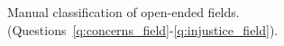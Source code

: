 \begin{figure}[h!]
    \caption[Manual classification of open-ended fields]{Manual classification of open-ended fields. (Questions~\ref{q:concerns_field}-\ref{q:injustice_field}).
    }\label{fig:field_manual}
\end{figure}

